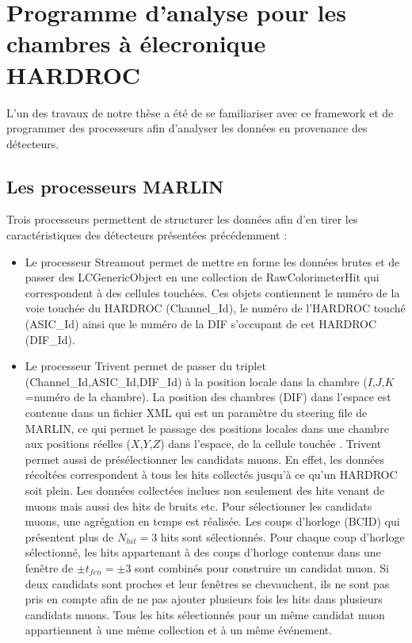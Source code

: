 \section{Programme d'analyse pour les chambres à élecronique HARDROC}
L'un des travaux de notre thèse a été de se familiariser avec ce framework et de programmer des processeurs afin d'analyser les données en provenance des détecteurs. 

\subsection{Les processeurs MARLIN}
Trois processeurs permettent de structurer les données afin d'en tirer les caractéristiques des détecteurs présentées précédemment :

\begin{itemize}[label=$\bullet$]
	\item Le processeur Streamout permet de mettre en forme les données brutes et de passer des LCGenericObject en une collection de RawColorimeterHit qui correspondent à des cellules touchées. Ces objets contiennent le numéro de la voie touchée du HARDROC (Channel\_Id), le numéro de l'HARDROC touché (ASIC\_Id) ainsi que le numéro de la DIF s'occupant de cet HARDROC (DIF\_Id).
	\item Le processeur Trivent permet de passer du triplet (Channel\_Id,ASIC\_Id,DIF\_Id) à la position locale dans la chambre ($I$,$J$,$K$=numéro de la chambre). La position des chambres (DIF) dans l'espace est contenue dans un fichier XML qui est un paramètre du steering file de MARLIN, ce qui permet le passage des positions locales dans une chambre aux positions réelles ($X$,$Y$,$Z$) dans l'espace, de la cellule touchée . Trivent permet aussi de présélectionner les candidats muons. En effet, les données récoltées correspondent à tous les hits collectés jusqu'à ce qu'un HARDROC soit plein. Les données collectées inclues non seulement des hits venant de muons mais aussi des hits de bruits etc. Pour sélectionner les candidats muons, une agrégation en temps est réalisée. Les coups d'horloge (BCID) qui présentent plus de $N_{hit}=3$ hits sont sélectionnés. Pour chaque coup d'horloge sélectionné, les hits appartenant à des coups d'horloge contenus dans une fenêtre de $\pm t_{fen}=\pm3$ sont combinés pour construire un candidat muon. Si deux candidats sont proches et leur fenêtres se chevauchent, ils ne sont pas pris en compte afin de ne pas ajouter plusieurs fois les hits dans plusieurs candidats muons. Tous les hits sélectionnés pour un même candidat muon appartiennent à une même collection et à un même événement.

\end{itemize}
